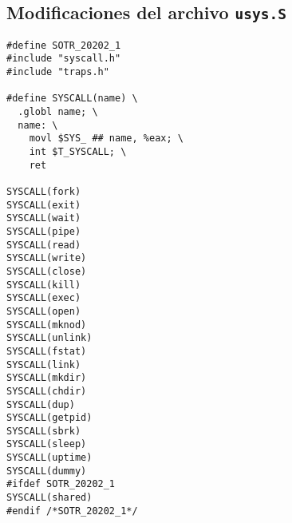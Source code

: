 \documentclass[12pt]{article}
\begin{document}
\subsection{Modif\/icaciones del archivo {\tt usys.S}}
\begin{verbatim}
#define SOTR_20202_1
#include "syscall.h"
#include "traps.h"

#define SYSCALL(name) \
  .globl name; \
  name: \
    movl $SYS_ ## name, %eax; \
    int $T_SYSCALL; \
    ret

SYSCALL(fork)
SYSCALL(exit)
SYSCALL(wait)
SYSCALL(pipe)
SYSCALL(read)
SYSCALL(write)
SYSCALL(close)
SYSCALL(kill)
SYSCALL(exec)
SYSCALL(open)
SYSCALL(mknod)
SYSCALL(unlink)
SYSCALL(fstat)
SYSCALL(link)
SYSCALL(mkdir)
SYSCALL(chdir)
SYSCALL(dup)
SYSCALL(getpid)
SYSCALL(sbrk)
SYSCALL(sleep)
SYSCALL(uptime)
SYSCALL(dummy)
#ifdef SOTR_20202_1
SYSCALL(shared)
#endif /*SOTR_20202_1*/
\end{verbatim}
\end{document}
